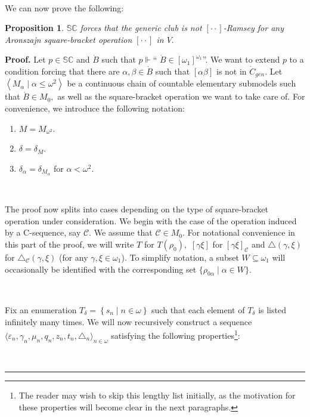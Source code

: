 \documentclass{article}
\newtheorem{proposition}[theorem]{Proposition}
\newenvironment{proof}[1][Proof]{\noindent\textbf{#1.} }{\ \rule{0.5em}{0.5em}}
\begin{document}
\qquad\ \ \qquad\ \ 

We can now prove the following:

\begin{proposition}
$\mathbb{SC}$ forces that the generic club is not $[\cdot\cdot]$-Ramsey for
any Aronszajn square-bracket operation $[\cdot\cdot]$ in $V.$
\label{Prop SC destruye a V}
\end{proposition}

\begin{proof}
Let $p\in\mathbb{SC}$ and $\dot{B}$ such that $p\Vdash$\textquotedblleft%
$\dot{B}\in\left[  \omega_{1}\right]  ^{\omega_{1}}$\textquotedblright. We
want to extend $p$ to a condition forcing that there are $\alpha,\beta\in
\dot{B}$ such that $\left[  \alpha\beta\right]  $ is not in $\dot{C}_{gen}$.
Let $\left\langle M_{\alpha}\mid\alpha\leq\omega^{2}\right\rangle $ be a
continuous chain of countable elementary submodels such that $\dot{B}\in
M_{0},$ as well as the square-bracket operation we want to take care of. For
convenience, we introduce the following notation:

\begin{enumerate}
\item $M=M_{\omega^{2}}.$

\item $\delta=\delta_{M}.$

\item $\delta_{\alpha}=\delta_{M_{\alpha}}$ for $\alpha<\omega^{2}.$
\end{enumerate}

\qquad\ \ \qquad\ \ \ \ \ \ \qquad\qquad\qquad\qquad\ \ \ \ 

The proof now splits into cases depending on the type of square-bracket
operation under consideration. We begin with the case of the operation induced
by a \textsf{C}-sequence, say $\mathcal{C}.$ We assume that $\mathcal{C}\in
M_{0}.$ For notational convenience in this part of the proof, we will write
$T$ for $T(\rho_{0}),$ $\left[  \gamma\xi\right]  $ for $\left[  \gamma
\xi\right]  _{\mathcal{C}}$ and $\triangle\left(  \gamma,\xi\right)  $ for
$\triangle_{\mathcal{C}}\left(  \gamma,\xi\right)  $ (for any $\gamma,\xi
\in\omega_{1}$). To simplify notation, a subset $W\subseteq\omega_{1}$ will
occasionally be identified with the corresponding set $\{\rho_{0\alpha}%
\mid\alpha\in W\}.$

\qquad\ \qquad\ \ \ \ \ \qquad\ \ 

Fix an enumeration $T_{\delta}=\left\{  s_{n}\mid n\in\omega\right\}  $ such
that each element of $T_{\delta}$ is listed infinitely many times. We will now
recursively construct a sequence $\langle\varepsilon_{n},\gamma_{n},\mu
_{n},q_{n},z_{n},t_{n},\triangle_{n}\rangle_{n\in\omega}$ satisfying the
following properties\footnote{The reader may wish to skip this lengthy list
initially, as the motivation for these properties will become clear in the
next paragraphs.}:


\end{proof}
\end{document}
